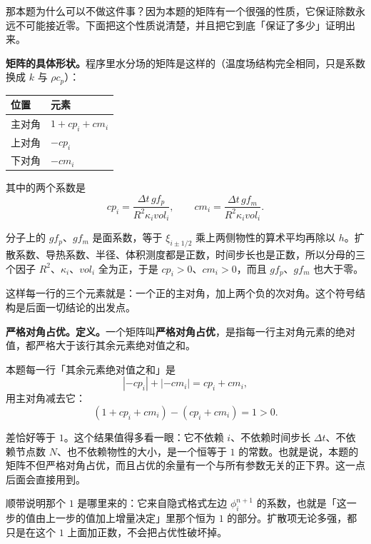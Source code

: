 那本题为什么可以不做这件事？因为本题的矩阵有一个很强的性质，它保证除数永远不可能接近零。下面把这个性质说清楚，并且把它到底「保证了多少」证明出来。

\textbf{矩阵的具体形状。}程序里水分场的矩阵是这样的（温度场结构完全相同，只是系数换成 $k$ 与 $\rho c_p$）：

\begin{center}
\begin{tabular}{@{}ll@{}}
\toprule
位置 & 元素 \\
\midrule
主对角 & $1+cp_i+cm_i$ \\
上对角 & $-cp_i$ \\
下对角 & $-cm_i$ \\
\bottomrule
\end{tabular}
\end{center}

其中的两个系数是
\begin{equation}
cp_i=\frac{\Delta t\,gf_p}{R^2\kappa_ivol_i},\qquad
cm_i=\frac{\Delta t\,gf_m}{R^2\kappa_ivol_i}.
\label{eq:p5-cpcm}
\end{equation}

分子上的 $gf_p$、$gf_m$ 是面系数，等于 $\xi_{i\pm1/2}$ 乘上两侧物性的算术平均再除以 $h$。扩散系数、导热系数、半径、体积测度都是正数，时间步长也是正数，所以分母的三个因子 $R^2$、$\kappa_i$、$vol_i$ 全为正，于是 $cp_i>0$、$cm_i>0$，而且 $gf_p$、$gf_m$ 也大于零。

这样每一行的三个元素就是：一个正的主对角，加上两个负的次对角。这个符号结构是后面一切结论的出发点。

\textbf{严格对角占优。}\textbf{定义。}一个矩阵叫\textbf{严格对角占优}，是指每一行主对角元素的绝对值，都严格大于该行其余元素绝对值之和。

本题每一行「其余元素绝对值之和」是
\begin{equation}
\left|-cp_i\right|+\left|-cm_i\right|=cp_i+cm_i ,
\label{eq:p5-offsum}
\end{equation}
用主对角减去它：
\begin{equation}
\left(1+cp_i+cm_i\right)-\left(cp_i+cm_i\right)=1>0 .
\label{eq:p5-margin}
\end{equation}

差恰好等于 $1$。这个结果值得多看一眼：它不依赖 $i$、不依赖时间步长 $\Delta t$、不依赖节点数 $N$、也不依赖物性的大小，是一个恒等于 $1$ 的常数。也就是说，本题的矩阵不但严格对角占优，而且占优的余量有一个与所有参数无关的正下界。这一点后面会直接用到。

顺带说明那个 $1$ 是哪里来的：它来自隐式格式左边 $\phi_i^{n+1}$ 的系数，也就是「这一步的值由上一步的值加上增量决定」里那个恒为 $1$ 的部分。扩散项无论多强，都只是在这个 $1$ 上面加正数，不会把占优性破坏掉。

